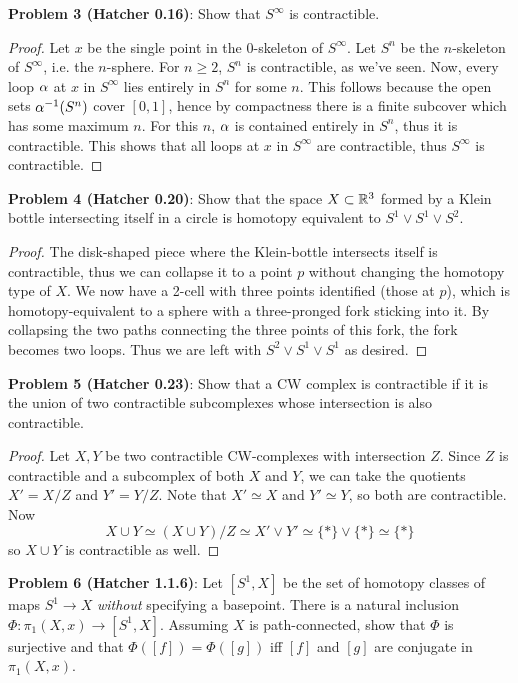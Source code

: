 \documentclass{amsart}
\begin{document}
\newpage 


\noindent \textbf{Problem 3 (Hatcher 0.16)}: Show that $S^{\infty}$ is contractible.
\begin{proof}
	Let $x$ be the single point in the $0$-skeleton of $S^{\infty}$. Let $S^n$ be the $n$-skeleton of $S^{\infty}$, i.e. the $n$-sphere. For $n\geq 2$, $S^n$ is contractible, as we've seen. Now, every loop $\alpha$ at $x$ in $S^{\infty}$ lies entirely in $S^n$ for some $n$. This follows because the open sets $\alpha^{-1}(S^n)$ cover $[0,1]$, hence by compactness there is a finite subcover which has some maximum $n$. For this $n$, $\alpha$ is contained entirely in $S^n$, thus it is contractible. This shows that all loops at $x$ in $S^{\infty}$ are contractible, thus $S^{\infty}$ is contractible.
\end{proof}
\newpage 


\noindent \textbf{Problem 4 (Hatcher 0.20)}: Show that the space $X\subset \mathbb{R}^3$ formed by a Klein bottle intersecting itself in a circle is homotopy equivalent to $S^1\vee S^1 \vee S^2$.
\begin{proof}
	The disk-shaped piece where the Klein-bottle intersects itself is contractible, thus we can collapse it to a point $p$ without changing the homotopy type of $X$. We now have a 2-cell with three points identified (those at $p$), which is homotopy-equivalent to a sphere with a three-pronged fork sticking into it. By collapsing the two paths connecting the three points of this fork, the fork becomes two loops. Thus we are left with $S^2\vee S^1\vee S^1$ as desired.
\end{proof}
\newpage 


\noindent \textbf{Problem 5 (Hatcher 0.23)}: Show that a CW complex is contractible if it is the union of two contractible subcomplexes whose intersection is also contractible.

\begin{proof}
	Let $X,Y$ be two contractible CW-complexes with intersection $Z$. Since $Z$ is contractible and a subcomplex of both $X$ and $Y$, we can take the quotients $X'=X/Z$ and $Y'=Y/Z$. Note that $X'\simeq X$ and $Y'\simeq Y$, so both are contractible. Now 
	$$X\cup Y \simeq (X\cup Y)/ Z \simeq X'\vee Y' \simeq \{\ast\}\vee \{\ast\} \simeq \{\ast\}$$ 
	so $X\cup Y$ is contractible as well.
\end{proof}

\newpage 


\noindent \textbf{Problem 6 (Hatcher 1.1.6)}: Let $[S^1,X]$ be the set of homotopy classes of maps $S^1\to X$ \textit{without} specifying a basepoint. 
There is a natural inclusion $\Phi:\pi_1(X,x)\to [S^1,X]$. Assuming $X$ is path-connected, show that $\Phi$ is surjective and that $\Phi([f])=\Phi([g])$ iff $[f]$ and $[g]$ are conjugate in $\pi_1(X,x)$. 
\end{document}
